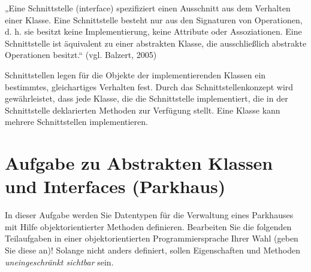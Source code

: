 \documentclass{lehramt-informatik}
\begin{document}
„Eine Schnittstelle (interface) spezifiziert einen Ausschnitt aus dem
Verhalten einer Klasse. Eine Schnittstelle besteht nur aus den
Signaturen von Operationen, d. h. sie besitzt keine Implementierung,
keine Attribute oder Assoziationen. Eine Schnittstelle ist äquivalent zu
einer abstrakten Klasse, die ausschließlich abstrakte Operationen
besitzt.“ (vgl. Balzert, 2005)

Schnittstellen legen für die Objekte der implementierenden Klassen ein
bestimmtes, gleichartiges Verhalten fest. Durch das
Schnittstellenkonzept wird gewährleistet, dass jede Klasse, die die
Schnittstelle implementiert, die in der Schnittstelle deklarierten
Methoden zur Verfügung stellt. Eine Klasse kann mehrere Schnittstellen
implementieren.


%

\section{Aufgabe zu Abstrakten Klassen und Interfaces (Parkhaus)}

\begin{quellen}
\item \cite{aud:ab:1}
\item \cite[Seite 11, Thema 2, Teilaufgabe 2, Aufgabe 1]{examen:66116:2014:03}
\end{quellen}

In dieser Aufgabe werden Sie Datentypen für die Verwaltung eines
Parkhauses mit Hilfe objektorientierter Methoden definieren. Bearbeiten
Sie die folgenden Teilaufgaben in einer objektorientierten
Programmiersprache Ihrer Wahl (geben Sie diese an)! Solange nicht anders
definiert, sollen Eigenschaften und Methoden \emph{uneingeschränkt
sichtbar} sein.
\end{document}
